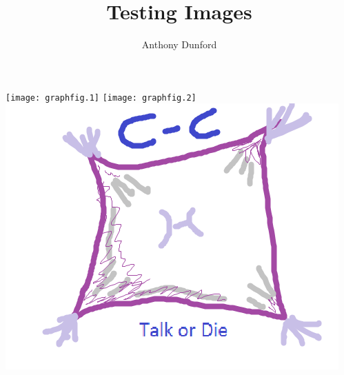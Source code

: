 \documentclass[a4paper]{article}
\title{Testing Images}
\author{Anthony Dunford}
\begin{document}
\maketitle
\texttt{[image: graphfig.1]}
\texttt{[image: graphfig.2]}
\includegraphics[scale=1]{CC}
\end{document}
